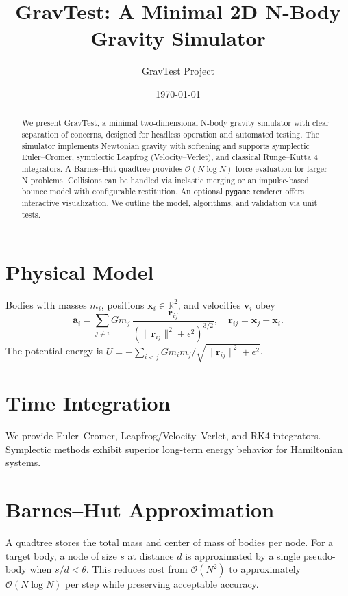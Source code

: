 \documentclass[11pt]{article}
\title{GravTest: A Minimal 2D N-Body Gravity Simulator}
\author{GravTest Project}
\date{\today}
\begin{document}
\maketitle
\begin{abstract}
We present GravTest, a minimal two-dimensional N-body gravity simulator with clear separation of concerns, designed for headless operation and automated testing. The simulator implements Newtonian gravity with softening and supports symplectic Euler--Cromer, symplectic Leapfrog (Velocity--Verlet), and classical Runge--Kutta 4 integrators. A Barnes--Hut quadtree provides $\mathcal{O}(N\log N)$ force evaluation for larger-N problems. Collisions can be handled via inelastic merging or an impulse-based bounce model with configurable restitution. An optional \texttt{pygame} renderer offers interactive visualization. We outline the model, algorithms, and validation via unit tests.
\end{abstract}

\section{Physical Model}
Bodies with masses $m_i$, positions $\mathbf{x}_i\in\mathbb{R}^2$, and velocities $\mathbf{v}_i$ obey
\begin{equation}
  \mathbf{a}_i = \sum_{j\ne i} G m_j\, \frac{\mathbf{r}_{ij}}{\left(\lVert\mathbf{r}_{ij}\rVert^2 + \epsilon^2\right)^{3/2}},\quad \mathbf{r}_{ij} = \mathbf{x}_j - \mathbf{x}_i.
\end{equation}
The potential energy is $U = -\sum_{i<j} G m_i m_j / \sqrt{\lVert\mathbf{r}_{ij}\rVert^2 + \epsilon^2}$.

\section{Time Integration}
We provide Euler--Cromer, Leapfrog/Velocity--Verlet, and RK4 integrators. Symplectic methods exhibit superior long-term energy behavior for Hamiltonian systems.

\section{Barnes--Hut Approximation}
A quadtree stores the total mass and center of mass of bodies per node. For a target body, a node of size $s$ at distance $d$ is approximated by a single pseudo-body when $s/d < \theta$. This reduces cost from $\mathcal{O}(N^2)$ to approximately $\mathcal{O}(N\log N)$ per step while preserving acceptable accuracy.
\end{document}
